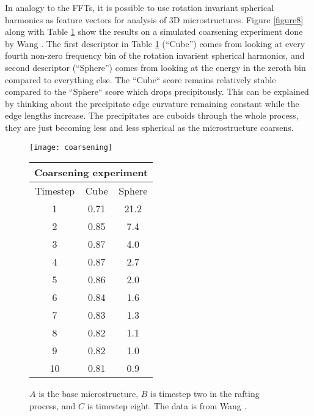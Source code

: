 \documentclass[review]{elsarticle}
\begin{document}
	In analogy to the FFTs, it is possible to use rotation invariant spherical harmonics \cite{spherical} as feature vectors for analysis of 3D microstructures. Figure \ref{figure8} along with Table \ref{table3} show the results on a simulated coarsening experiment done by Wang \cite{ywang2}. The first descriptor in Table \ref{table3} (``Cube'') comes from looking at every fourth non-zero frequency bin of the rotation invarient spherical harmonics, and second descriptor (``Sphere'') comes from looking at the energy in the zeroth bin compared to everything else. The ``Cube`` score remains relatively stable compared to the ``Sphere`` score which drops precipitously. This can be explained by thinking about the precipitate edge curvature remaining constant while the edge lengths increase. The precipitates are cuboids through the whole process, they are just becoming less and less spherical as the microstructure coarsens.
	
	\begin{figure}[!ht]
    	\begin{center}
			\texttt{[image: coarsening]}
	  		\caption{ $A$ is the base microstructure, $B$ is timestep two in the rafting process, and $C$ is timestep eight. The data is from Wang \cite{ywang2}. }
	  		\label{figure8}
  		
			\begin{tabular}{ c | c | c }
				\multicolumn{3}{c}{\textbf{Coarsening experiment}} \\
				\hline
				Timestep & Cube & Sphere \\
				\hline
				1 & 0.71 & 21.2 \\
				2 & 0.85 & 7.4 \\
				3 & 0.87 & 4.0 \\
				4 & 0.87 & 2.7 \\
				5 & 0.86 & 2.0 \\
				6 & 0.84 & 1.6 \\
				7 & 0.83 & 1.3 \\
				8 & 0.82 & 1.1 \\
				9 & 0.82 & 1.0 \\
				10 & 0.81 & 0.9 \\
				\hline
			\end{tabular}
			\label{table3}
		\end{center}
	\end{figure}
	
\end{document}
